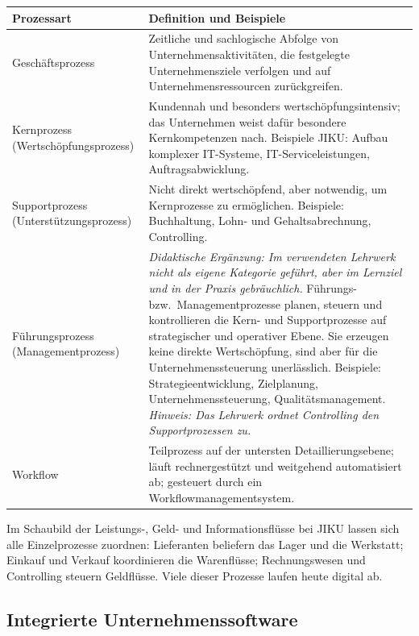 \documentclass[11pt, a4paper]{article}
\begin{document}
\begin{center}
\begin{tabular}{p{3.5cm} p{9.5cm}}
\toprule
\textbf{Prozessart} & \textbf{Definition und Beispiele}\\
\midrule
Geschäftsprozess & Zeitliche und sachlogische Abfolge von Unternehmensaktivitäten, die festgelegte Unternehmensziele verfolgen und auf Unternehmensressourcen zurückgreifen.\\
\addlinespace
Kernprozess (Wertschöpfungs\-prozess) & Kundennah und besonders wertschöpfungsintensiv; das Unternehmen weist dafür besondere Kernkompetenzen nach. Beispiele JIKU: Aufbau komplexer IT-Systeme, IT-Serviceleistungen, Auftragsabwicklung.\\
\addlinespace
Supportprozess (Unterstützungs\-prozess) & Nicht direkt wertschöpfend, aber notwendig, um Kernprozesse zu ermöglichen. Beispiele: Buchhaltung, Lohn- und Gehaltsabrechnung, Controlling.\\
\addlinespace
Führungsprozess (Management\-prozess) & \emph{Didaktische Ergänzung: Im verwendeten Lehrwerk nicht als eigene Kategorie geführt, aber im Lernziel und in der Praxis gebräuchlich.} Führungs- bzw.\ Managementprozesse planen, steuern und kontrollieren die Kern- und Supportprozesse auf strategischer und operativer Ebene. Sie erzeugen keine direkte Wertschöpfung, sind aber für die Unternehmenssteuerung unerlässlich. Beispiele: Strategieentwicklung, Zielplanung, Unternehmenssteuerung, Qualitätsmanagement. \emph{Hinweis: Das Lehrwerk ordnet Controlling den Supportprozessen zu.}\\
\addlinespace
Workflow & Teilprozess auf der untersten Detaillierungsebene; läuft rechnergestützt und weitgehend automatisiert ab; gesteuert durch ein Workflowmanagementsystem.\\
\bottomrule
\end{tabular}
\end{center}

\begin{merksatz}[title={\bfseries JIKU-Praxisbeispiel: Leistungs-, Geld- und Informationsflüsse}]
Im Schaubild der Leistungs-, Geld- und Informationsflüsse bei JIKU lassen sich alle
Einzelprozesse zuordnen: Lieferanten beliefern das Lager und die Werkstatt; Einkauf und
Verkauf koordinieren die Warenflüsse; Rechnungswesen und Controlling steuern Geldflüsse.
Viele dieser Prozesse laufen heute digital ab.
\end{merksatz}

\subsection{Integrierte Unternehmenssoftware}
\end{document}
